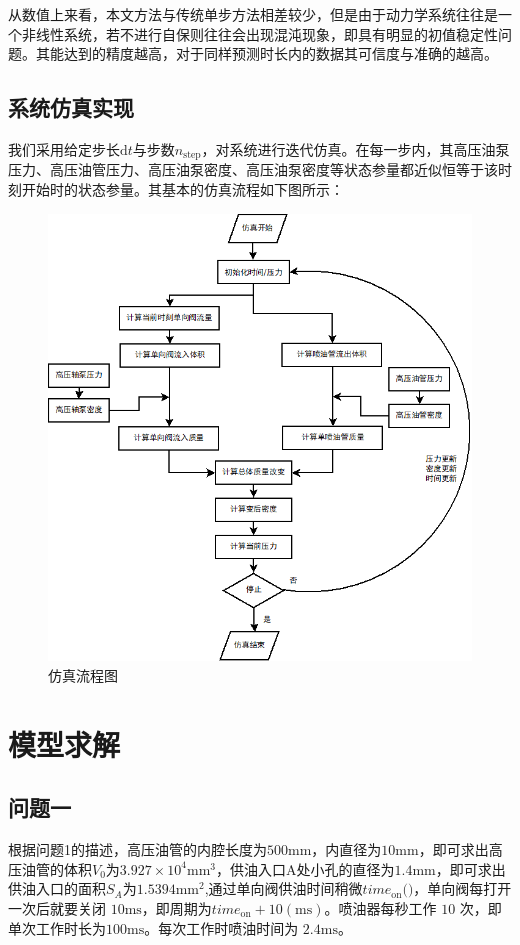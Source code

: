 \documentclass{article}
\newcounter{sub}
\begin{document}
从数值上来看，本文方法与传统单步方法相差较少，但是由于动力学系统往往是一个非线性系统\cite{2002计算方法引论}，若不进行自保则往往会出现混沌现象，即具有明显的初值稳定性问题。其能达到的精度越高，对于同样预测时长内的数据其可信度与准确的越高。

\subsection{系统仿真实现}
我们采用给定步长$\text{d}t$与步数$n_{\text{step}}$，对系统进行迭代仿真。在每一步内，其高压油泵压力、高压油管压力、高压油泵密度、高压油泵密度等状态参量都近似恒等于该时刻开始时的状态参量。其基本的仿真流程如下图所示：
\begin{figure}[H]
	\centering
	\includegraphics[width=\linewidth]{1-5.png}
	\caption{仿真流程图}
	\label{fig:}
\end{figure}

\section{模型求解}
\subsection{问题一}
根据问题1的描述，高压油管的内腔长度为$500\text{mm}$，内直径为$10\text{mm}$，即可求出高压油管的体积$V_0$为$3.927\times 10^4\text{mm}^3$，供油入口A处小孔的直径为$1.4\text{mm}$，即可求出供油入口的面积$S_A$为$1.5394\text{mm}^2$,通过单向阀供油时间稍微$time_{\text{on}}($$)$，单向阀每打开一次后就要关闭 $10\text{ms}$，即周期为$time_{\text{on}}+10(\text{ms})$。喷油器每秒工作 $10$ 次，即单次工作时长为$100\text{ms}$。每次工作时喷油时间为 $2.4\text{ms}$。
\end{document}
